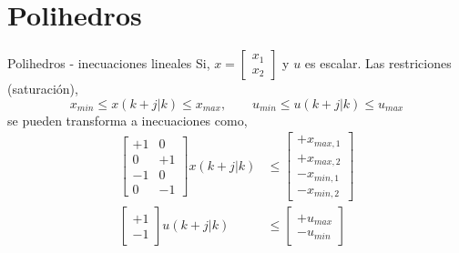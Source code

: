 \documentclass[8pt]{beamer}
\begin{document}
\section{Polihedros}
\begin{frame}[fragile]{Polihedros - inecuaciones lineales}
	Si, $x=\begin{bmatrix}
		x_1 \\
		x_2
	\end{bmatrix}$ y $u$ es escalar. Las restriciones (saturación),
	\begin{equation*}
		x_{min} \leq x(k+j|k) \leq x_{max}, \qquad u_{min} \leq u(k+j|k) \leq u_{max}
	\end{equation*}
	se pueden transforma a inecuaciones como,	
	\begin{align*}
	\begin{bmatrix}
		+1 & 0  \\
		0  & +1 \\
		-1 & 0  \\
		0  & -1
	\end{bmatrix}
	x(k+j|k) & \leq
	\begin{bmatrix}
		+x_{max,1}  \\
		+x_{max,2}  \\
		-x_{min,1}  \\
		-x_{min,2} 
	\end{bmatrix}
	\\
	\begin{bmatrix}
		+1 \\
		-1
	\end{bmatrix}
	u(k+j|k) & \leq
	\begin{bmatrix}
		+u_{max}  \\
		-u_{min}
	\end{bmatrix}
	\end{align*}
\end{frame}
\end{document}
